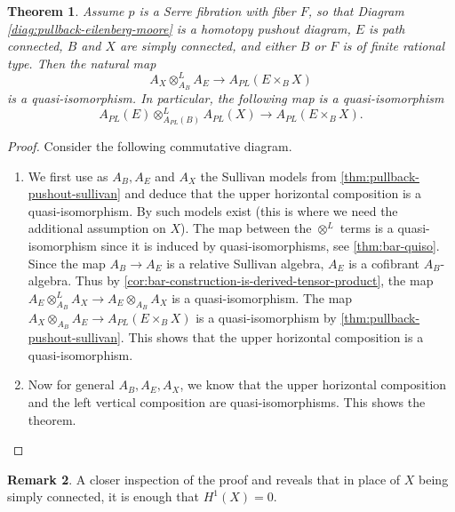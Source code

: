 \documentclass{scrartcl}
\theoremstyle{plain}
\newtheorem{theorem}{Theorem}[section]
\theoremstyle{definition}
\newtheorem{remark}[theorem]{Remark}
\newcommand{\APL}{A_{PL}}
\newcommand{\quiso}{\simeq}
\begin{document}
\begin{theorem}\label{thm:pullback-pushout}
Assume $p$ is a Serre fibration with fiber $F$, so that Diagram \ref{diag:pullback-eilenberg-moore} is a homotopy pushout diagram, $E$ is path connected, $B$ and $X$ are simply connected, and either $B$ or $F$ is of finite rational type. Then the natural map
$$A_X\otimes_{A_B}^L A_E \to \APL(E\times_B X)$$
is a quasi-isomorphism. In particular, the following map is a quasi-isomorphism $$\APL(E)\otimes^L_{\APL(B)} \APL(X)\to \APL(E\times_B X).$$
\end{theorem}
\begin{proof}
    Consider the following commutative diagram.
    \begin{center}
    \end{center}
    \begin{enumerate}
    \item We first use as $A_B, A_E$ and $A_X$ the Sullivan models from \cref{thm:pullback-pushout-sullivan} and deduce that the upper horizontal composition is a quasi-isomorphism. By \cite[Thm 14.3]{felix2012rational} such models exist (this is where we need the additional assumption on $X$).
    The map between the $\otimes^L$ terms is a quasi-isomorphism since it is induced by quasi-isomorphisms, see \ref{thm:bar-quiso}. 
    Since the map $A_B\to A_E$ is a relative Sullivan algebra, $A_E$ is a cofibrant $A_B$-algebra. Thus by \ref{cor:bar-construction-is-derived-tensor-product}, the map $A_E\otimes^L_{A_B} A_X\to A_E\otimes_{A_B} A_X$ is a quasi-isomorphism. The map $A_X\otimes_{A_B} A_E \to \APL(E\times_B X)$ is a quasi-isomorphism by \cref{thm:pullback-pushout-sullivan}. This shows that the upper horizontal composition is a quasi-isomorphism.
    \item Now for general $A_B, A_E, A_X$, we know that the upper horizontal composition and the left vertical composition are quasi-isomorphisms. This shows the theorem. 
    \end{enumerate}
\end{proof}

\begin{remark}
    A closer inspection of the proof and \cite[Thm 14.3]{felix2012rational} reveals that in place of $X$ being simply connected, it is enough that $H^1(X) = 0$. 
\end{remark}
\end{document}
